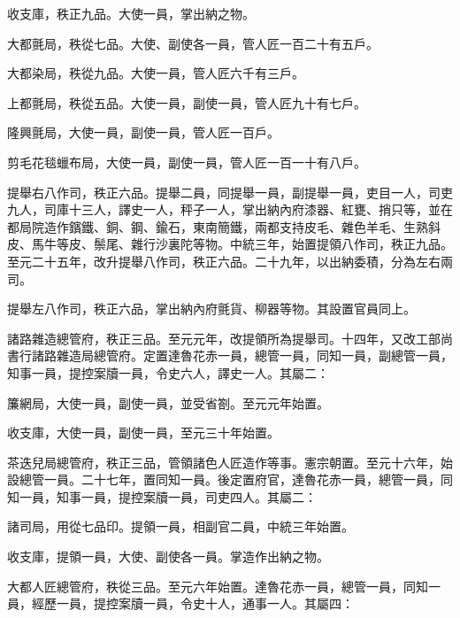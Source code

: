 \begin{pinyinscope}
 收支庫，秩正九品。大使一員，掌出納之物。



 大都氈局，秩從七品。大使、副使各一員，管人匠一百二十有五戶。



 大都染局，秩從九品。大使一員，管人匠六千有三戶。



 上都氈局，秩從五品。大使一員，副使一員，管人匠九十有七戶。



 隆興氈局，大使一員，副使一員，管人匠一百戶。



 剪毛花毯蠟布局，大使一員，副使一員，管人匠一百一十有八戶。



 提舉右八作司，秩正六品。提舉二員，同提舉一員，副提舉一員，吏目一人，司吏九人，司庫十三人，譯史一人，秤子一人，掌出納內府漆器、紅甕、捎只等，並在都局院造作鑌鐵、銅、鋼、鍮石，東南簡鐵，兩都支持皮毛、雜色羊毛、生熟斜皮、馬牛等皮、鬃尾、雜行沙裏陀等物。中統三年，始置提領八作司，秩正九品。至元二十五年，改升提舉八作司，秩正六品。二十九年，以出納委積，分為左右兩司。



 提舉左八作司，秩正六品，掌出納內府氈貨、柳器等物。其設置官員同上。



 諸路雜造總管府，秩正三品。至元元年，改提領所為提舉司。十四年，又改工部尚書行諸路雜造局總管府。定置達魯花赤一員，總管一員，同知一員，副總管一員，知事一員，提控案牘一員，令史六人，譯史一人。其屬二：



 簾網局，大使一員，副使一員，並受省劄。至元元年始置。



 收支庫，大使一員，副使一員，至元三十年始置。



 茶迭兒局總管府，秩正三品，管領諸色人匠造作等事。憲宗朝置。至元十六年，始設總管一員。二十七年，置同知一員。後定置府官，達魯花赤一員，總管一員，同知一員，知事一員，提控案牘一員，司吏四人。其屬二：



 諸司局，用從七品印。提領一員，相副官二員，中統三年始置。



 收支庫，提領一員，大使、副使各一員。掌造作出納之物。



 大都人匠總管府，秩從三品。至元六年始置。達魯花赤一員，總管一員，同知一員，經歷一員，提控案牘一員，令史十人，通事一人。其屬四：




\end{pinyinscope}
